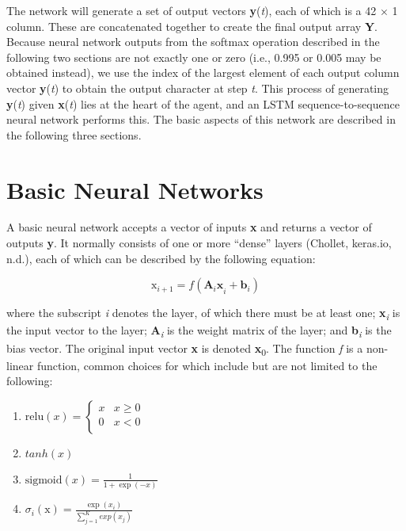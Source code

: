 \documentclass[
]{article}
\begin{document}
The network will generate a set of output vectors \textbf{y}(\emph{t}),
each of which is a 42 × 1 column. These are concatenated together to
create the final output array \textbf{Y}. Because neural network outputs
from the softmax operation described in the following two sections are
not exactly one or zero (i.e., 0.995 or 0.005 may be obtained instead),
we use the index of the largest element of each output column vector
\textbf{y}(\emph{t}) to obtain the output character at step \emph{t}.
This process of generating \textbf{y}(\emph{t}) given
\textbf{x}(\emph{t}) lies at the heart of the agent, and an LSTM
sequence-to-sequence neural network performs this. The basic aspects of
this network are described in the following three sections.

\hypertarget{basic-neural-networks}{%
\section{Basic Neural Networks}\label{basic-neural-networks}}

A basic neural network accepts a vector of inputs \textbf{x} and returns
a vector of outputs \textbf{y}. It normally consists of one or more
``dense'' layers (Chollet, keras.io, n.d.), each of which can be
described by the following equation:

\[\text{x}_{i + 1} = f({\mathbf{A}_{i}\mathbf{x}}_{i} + \mathbf{b}_{i})\]

where the subscript \emph{i} denotes the layer, of which there must be
at least one; \textbf{x}\emph{\textsubscript{i}} is the input vector to
the layer; \textbf{A}\emph{\textsubscript{i}} is the weight matrix of
the layer; and \textbf{b}\emph{\textsubscript{i}} is the bias vector.
The original input vector \textbf{x} is denoted
\textbf{x}\textsubscript{0}. The function \emph{f} is a non-linear
function, common choices for which include but are not limited to the
following:

\begin{enumerate}
\def\labelenumi{\arabic{enumi}.}
\item
  \(\text{relu}(x) = \left\{ \begin{matrix}
  x & x \geq 0 \\
  0 & x < 0 \\
  \end{matrix} \right.\ \)
\item
  \(tanh(x)\)
\item
  \(\text{sigmoid}(x) = \frac{1}{1 + \exp( - x)}\)
\item
  \(\sigma_{i}\left( \text{x} \right) = \frac{\exp\left( x_{i} \right)}{\sum_{j = 1}^{K}{exp\left( x_{j} \right)}}\)
\end{enumerate}
\end{document}
